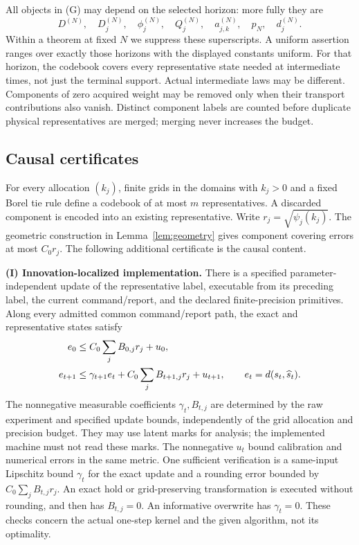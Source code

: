 All objects in \textup{(G)} may depend on the selected horizon: more fully they are \[D^{(N)},\quad D_j^{(N)},\quad\phi_j^{(N)},\quad Q_j^{(N)},\quad a_{j,k}^{(N)},\quad p_N,\quad d_j^{(N)}.\] Within a theorem at fixed $N$ we suppress these superscripts. A uniform assertion ranges over exactly those horizons with the displayed constants uniform. For that horizon, the codebook covers every representative state needed at intermediate times, not just the terminal support. Actual intermediate laws may be different. Components of zero acquired weight may be removed only when their transport contributions also vanish. Distinct component labels are counted before duplicate physical representatives are merged; merging never increases the budget.

\subsection{Causal certificates}
For every allocation $(k_j)$, finite grids in the domains with $k_j>0$ and a fixed Borel tie rule define a codebook of at most $m$ representatives. A discarded component is encoded into an existing representative. Write $r_j=\sqrt{\psi_j(k_j)}$. The geometric construction in Lemma~\ref{lem:geometry} gives component covering errors at most $C_0r_j$. The following additional certificate is the causal content.

\smallskip\noindent\textbf{(I) Innovation-localized implementation.}
There is a specified parameter-independent update of the representative label, executable from its preceding label, the current command/report, and the declared finite-precision primitives. Along every admitted common command/report path, the exact and representative states satisfy
\begin{align}
 e_0&\le C_0\sum_j B_{0,j}r_j+u_0,\notag\\
 e_{t+1}&\le \gamma_{t+1}e_t+C_0\sum_j B_{t+1,j}r_j+u_{t+1},
 \qquad e_t=d(s_t,\widehat s_t).\label{eq:innovation}
\end{align}
The nonnegative measurable coefficients $\gamma_t,B_{t,j}$ are determined by the raw experiment and specified update bounds, independently of the grid allocation and precision budget. They may use latent marks for analysis; the implemented machine must not read these marks. The nonnegative $u_t$ bound calibration and numerical errors in the same metric. One sufficient verification is a same-input Lipschitz bound $\gamma_t$ for the exact update and a rounding error bounded by $C_0\sum_jB_{t,j}r_j$. An exact hold or grid-preserving transformation is executed without rounding, and then has $B_{t,j}=0$. An informative overwrite has $\gamma_t=0$. These checks concern the actual one-step kernel and the given algorithm, not its optimality.

